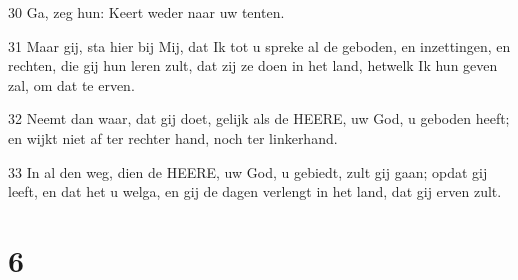 \par 30 Ga, zeg hun: Keert weder naar uw tenten.
\par 31 Maar gij, sta hier bij Mij, dat Ik tot u spreke al de geboden, en inzettingen, en rechten, die gij hun leren zult, dat zij ze doen in het land, hetwelk Ik hun geven zal, om dat te erven.
\par 32 Neemt dan waar, dat gij doet, gelijk als de HEERE, uw God, u geboden heeft; en wijkt niet af ter rechter hand, noch ter linkerhand.
\par 33 In al den weg, dien de HEERE, uw God, u gebiedt, zult gij gaan; opdat gij leeft, en dat het u welga, en gij de dagen verlengt in het land, dat gij erven zult.

\chapter{6}

